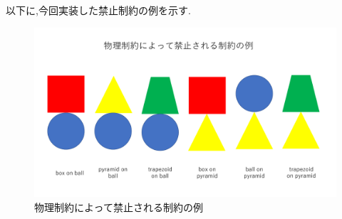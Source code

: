 \documentclass[uplatex,12pt]{jsarticle}
\begin{document}
以下に,今回実装した禁止制約の例を示す. \\

\begin{figure}[!hbt]
  \centering
  \includegraphics[scale=0.35]{images/prohibit-rules.pdf}
  \caption{物理制約によって禁止される制約の例}
\end{figure}
\end{document}
